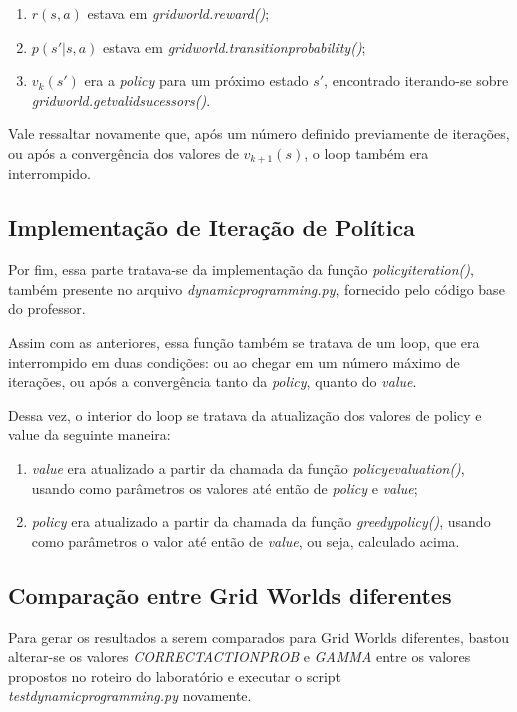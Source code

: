 \documentclass[conference]{IEEEtran}
\begin{document}
\begin{enumerate}
\item $r \left ( s, a \right )$ estava em \textit{grid\underline{\space}world.reward()};

\item $p \left ( s' | s, a \right )$ estava em \textit{grid\underline{\space}world.transition\underline{\space}probability()};

\item $v_k \left ( s' \right )$ era a \textit{policy} para um próximo estado $s'$, encontrado iterando-se sobre \textit{grid\underline{\space}world.get\underline{\space}valid\underline{\space}sucessors()}.
\end{enumerate}

Vale ressaltar novamente que, após um número definido previamente de iterações, ou após a convergência dos valores de $v_{k+1}(s)$, o loop também era interrompido.

\subsection{Implementação de Iteração de Política}
Por fim, essa parte tratava-se da implementação da função \textit{policy\underline{\space}iteration()}, também presente no arquivo \textit{dynamic\underline{\space}programming.py}, fornecido pelo código base do professor.

Assim com as anteriores, essa função também se tratava de um loop, que era interrompido em duas condições: ou ao chegar em um número máximo de iterações, ou após a convergência tanto da \textit{policy}, quanto do \textit{value}.

Dessa vez, o interior do loop se tratava da atualização dos valores de policy e value da seguinte maneira:

\begin{enumerate}
\item \textit{value} era atualizado a partir da chamada da função \textit{policy\underline{\space}evaluation()}, usando como parâmetros os valores até então de \textit{policy} e \textit{value};

\item \textit{policy} era atualizado a partir da chamada da função \textit{greedy\underline{\space}policy()}, usando como parâmetros o valor até então de \textit{value}, ou seja, calculado acima.
\end{enumerate}

\subsection{Comparação entre Grid Worlds diferentes}
Para gerar os resultados a serem comparados para Grid Worlds diferentes, bastou alterar-se os valores \textit{CORRECT\underline{\space}ACTION\underline{\space}PROB} e \textit{GAMMA} entre os valores propostos no roteiro do laboratório \cite{roteiro} e executar o script \textit{test\underline{\space}dynamic\underline{\space}programming.py} novamente.
\end{document}
